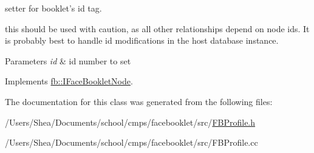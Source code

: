 setter for booklet's id tag. 

this should be used with caution, as all other relationships depend on node ids. It is probably best to handle id modifications in the host database instance.


\begin{DoxyParams}{Parameters}
{\em id} & id number to set \\
\hline
\end{DoxyParams}


Implements \hyperlink{structfb_1_1_i_face_booklet_node_a944a07a514d6c88414c533dc7be3193d}{fb\+::\+I\+Face\+Booklet\+Node}.



The documentation for this class was generated from the following files\+:\begin{DoxyCompactItemize}
\item 
/\+Users/\+Shea/\+Documents/school/cmps/facebooklet/src/\hyperlink{_f_b_profile_8h}{F\+B\+Profile.\+h}\item 
/\+Users/\+Shea/\+Documents/school/cmps/facebooklet/src/F\+B\+Profile.\+cc\end{DoxyCompactItemize}
